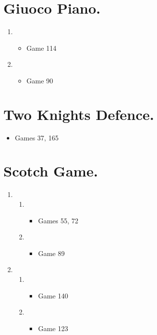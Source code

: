 \begin{multicols}{2}
\section{Giuoco Piano.} 
\newgame{}

\begin{enumerate}
\item {}
\begin{itemize}
\item Game 114
\end{itemize}

\item {}
\begin{itemize}
\item Game 90
\end{itemize}
\end{enumerate}

\section{Two Knights Defence.}
\newgame{}
\begin{itemize}
\item Games 37, 165
\end{itemize}

\section{Scotch Game.}
\newgame{}

\begin{enumerate}
\item {}
\begin{enumerate}
\item {}
\begin{itemize}
\item Games 55, 72
\end{itemize}
\item {}
\begin{itemize}
\item Game 89
\end{itemize}
\end{enumerate}

\item {}
\begin{enumerate}
\item {}
\begin{itemize}
\item Game 140
\end{itemize}
\item {}
\begin{itemize}
\item Game 123
\end{itemize}
\end{enumerate}
\end{enumerate}


\end{multicols}
